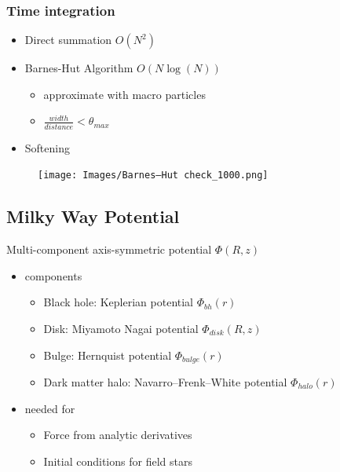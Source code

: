 \documentclass{beamer}
\begin{document}
\begin{frame}
\frametitle{Time integration}

\begin{itemize}
\item<1-> Direct summation \(O(N^2)\)
\item<2-> Barnes-Hut Algorithm \(O(N\log(N))\)
	\begin{itemize}
	 \item approximate with macro particles
	 \item \(\frac{width}{distance} < \theta_{max}\)
	\end{itemize}
\item<3-> Softening
\end{itemize}

\end{frame}



\begin{frame}
\begin{figure}
\centering
\texttt{[image: Images/Barnes–Hut check\_1000.png]}
\end{figure}
\end{frame}


\subsection{Milky Way Potential}

\begin{frame}

Multi-component axis-symmetric potential \(\Phi \left ( R,z \right )\)

\begin{itemize}
\item components
	\begin{itemize}
	\item Black hole: Keplerian potential \(\Phi_{bh} \left ( r \right )\)
	\item Disk: Miyamoto Nagai potential \(\Phi_{disk} \left ( R,z \right )\)
	\item Bulge: Hernquist potential \(\Phi_{bulge} \left ( r\right )\)
	\item Dark matter halo: Navarro–Frenk–White potential \(\Phi_{halo} \left ( r \right )\)
	\end{itemize}
\item needed for
	\begin{itemize}
	\item Force from analytic derivatives
	\item Initial conditions for field stars
	\end{itemize}
\end{itemize}

\end{frame}
\end{document}
